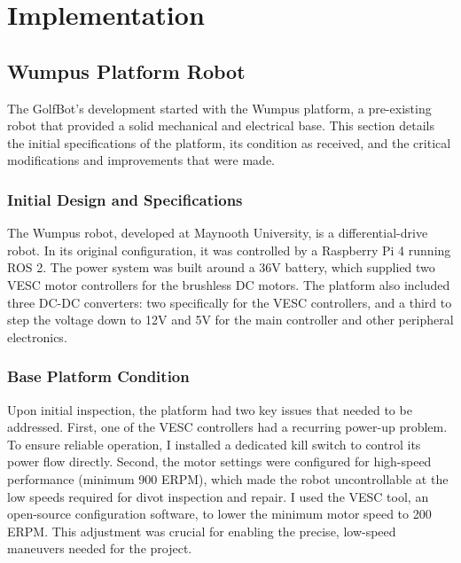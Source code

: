 \chapter{Implementation}
\label{chap:implementation}

\section{Wumpus Platform Robot}
\label{sec:wumpus_platform}
The GolfBot's development started with the Wumpus platform, a pre-existing robot that provided a solid mechanical and electrical base. This section details the initial specifications of the platform, its condition as received, and the critical modifications and improvements that were made.

\subsection{Initial Design and Specifications}
\label{ssec:initial_design}
The Wumpus robot, developed at Maynooth University, is a differential-drive robot. In its original configuration, it was controlled by a Raspberry Pi 4 running ROS 2. The power system was built around a 36V battery, which supplied two VESC motor controllers for the brushless DC motors. The platform also included three DC-DC converters: two specifically for the VESC controllers, and a third to step the voltage down to 12V and 5V for the main controller and other peripheral electronics.

\subsection{Base Platform Condition}
\label{ssec:base_condition}
Upon initial inspection, the platform had two key issues that needed to be addressed. First, one of the VESC controllers had a recurring power-up problem. To ensure reliable operation, I installed a dedicated kill switch to control its power flow directly. Second, the motor settings were configured for high-speed performance (minimum 900 ERPM), which made the robot uncontrollable at the low speeds required for divot inspection and repair. I used the VESC tool, an open-source configuration software, to lower the minimum motor speed to 200 ERPM. This adjustment was crucial for enabling the precise, low-speed maneuvers needed for the project.


